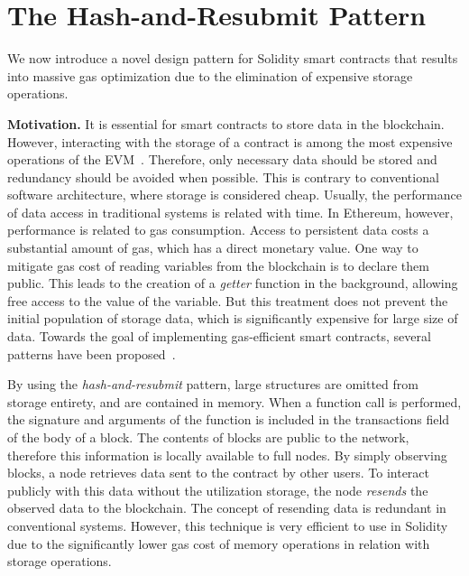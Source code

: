 \section{The Hash-and-Resubmit Pattern}

We now introduce a novel design pattern for Solidity smart contracts that
results into massive gas optimization due to the elimination of expensive
storage operations.

\textbf{Motivation.}
It is essential for smart contracts to store data in the blockchain. However,
interacting with the storage of a contract is among the most expensive
operations of the EVM~\cite{wood, buterin}. Therefore, only necessary data
should be stored and redundancy should be avoided when possible. This is
contrary to conventional software architecture, where storage is considered
cheap. Usually, the performance of data access in traditional systems is
related with time. In Ethereum, however, performance is related to gas
consumption. Access to persistent data costs a substantial amount of gas, which
has a direct monetary value. One way to mitigate gas cost of reading variables
from the blockchain is to declare them public.  This leads to the creation of a
\emph{getter} function in the background, allowing free access to the value of
the variable. But this treatment does not prevent the initial population of
storage data, which is significantly expensive for large size of data.
Towards the goal of implementing gas-efficient smart contracts, several
patterns have been proposed~\cite{contract-opt-1, contract-opt-2,
contract-opt-3, contract-opt-4}.

By using the \emph{hash-and-resubmit} pattern, large structures are omitted
from storage entirety, and are contained in memory. When a function call is
performed, the signature and arguments of the function is included in the
transactions field of the body of a block. The contents of blocks are public to
the network, therefore this information is locally available to full nodes. By
simply observing blocks, a node retrieves data sent to the contract by other
users. To interact publicly with this data without the utilization storage, the
node \emph{resends} the observed data to the blockchain. The concept of
resending data is redundant in conventional systems. However, this technique
is very efficient to use in Solidity due to the significantly lower gas cost
of memory operations in relation with storage operations.

